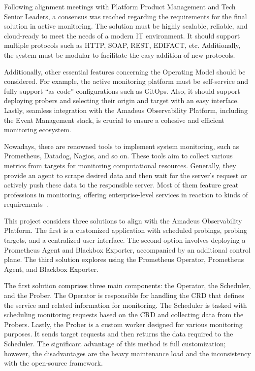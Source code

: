Following alignment meetings with Platform Product Management and Tech Senior Leaders, a consensus was reached regarding the requirements for the final solution in active monitoring. The solution must be highly scalable, reliable, and cloud-ready to meet the needs of a modern \ac{IT} environment. It should support multiple protocols such as \ac{HTTP}, \ac{SOAP}, \ac{REST}, \ac{EDIFACT}, etc. Additionally, the system must be modular to facilitate the easy addition of new protocols.

Additionally, other essential features concerning the Operating Model should be considered. For example, the active monitoring platform must be self-service and fully support “as-code” configurations such as GitOps. Also, it should support deploying probers and selecting their origin and target with an easy interface. Lastly, seamless integration with the Amadeus Observability Platform, including the Event Management stack, is crucial to ensure a cohesive and efficient monitoring ecosystem.

Nowadays, there are renowned tools to implement system monitoring, such as Prometheus, Datadog, Nagios, and so on. These tools aim to collect various metrics from targets for monitoring computational resources. Generally, they provide an agent to scrape desired data and then wait for the server's request or actively push these data to the responsible server. Most of them feature great professions in monitoring, offering enterprise-level services in reaction to kinds of requirements~\parencite{nevesDetailedBlackboxMonitoring2021}.

This project considers three solutions to align with the Amadeus Observability Platform. The first is a customized application with scheduled probings, probing targets, and a centralized user interface. The second option involves deploying a Prometheus Agent and Blackbox Exporter, accompanied by an additional control plane. The third solution explores using the Prometheus Operator, Prometheus Agent, and Blackbox Exporter. 

The first solution comprises three main components: the Operator, the Scheduler, and the Prober. The Operator is responsible for handling the \ac{CRD} that defines the service and related information for monitoring. The Scheduler is tasked with scheduling monitoring requests based on the \ac{CRD} and collecting data from the Probers. Lastly, the Prober is a custom worker designed for various monitoring purposes. It sends target requests and then returns the data required to the Scheduler. The significant advantage of this method is full customization; however, the disadvantages are the heavy maintenance load and the inconsistency with the open-source framework. 

